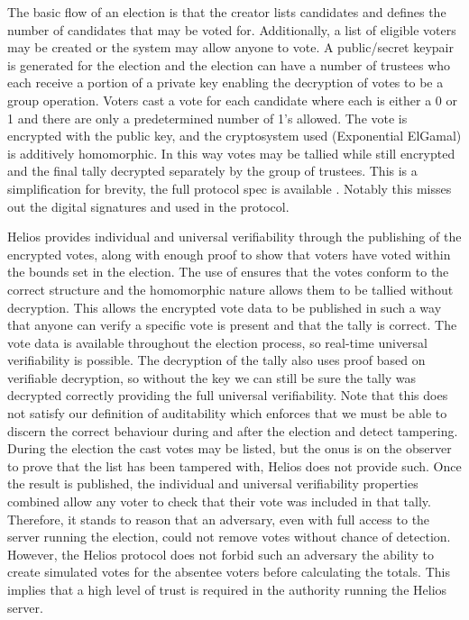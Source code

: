 The basic flow of an election is that the creator lists candidates and defines the number of candidates that may be voted for. Additionally, a list of eligible voters may be created or the system may allow anyone to vote. A public/secret keypair is generated for the election and the election can have a number of trustees who each receive a portion of a private key enabling the decryption of votes to be a group operation. Voters cast a vote for each candidate where each is either a 0 or 1 and there are only a predetermined number of 1's allowed. The vote is encrypted with the public key, and the cryptosystem used (Exponential ElGamal) is additively homomorphic. In this way votes may be tallied while still encrypted and the final tally decrypted separately by the group of trustees. This is a simplification for brevity, the full protocol spec is available \cite{HeliosHeliosV3}. Notably this misses out the digital signatures and  used in the protocol.

Helios provides individual and universal verifiability through the publishing of the encrypted votes, along with enough proof to show that voters have voted within the bounds set in the election. The use of  ensures that the votes conform to the correct structure and the homomorphic nature allows them to be tallied without decryption. This allows the encrypted vote data to be published in such a way that anyone can verify a specific vote is present and that the tally is correct. The vote data is available throughout the election process, so real-time universal verifiability is possible. The decryption of the tally also uses proof based on verifiable decryption, so without the key we can still be sure the tally was decrypted correctly providing the full universal verifiability. Note that this does not satisfy our definition of auditability which enforces that we must be able to discern the correct behaviour during and after the election and detect tampering. During the election the cast votes may be listed, but the onus is on the observer to prove that the list has been tampered with, Helios does not provide such. Once the result is published, the individual and universal verifiability properties combined allow any voter to check that their vote was included in that tally. Therefore, it stands to reason that an adversary, even with full access to the server running the election, could not remove votes without chance of detection. However, the Helios protocol does not forbid such an adversary the ability to create simulated votes for the absentee voters before calculating the totals. This implies that a high level of trust is required in the authority running the Helios server.

